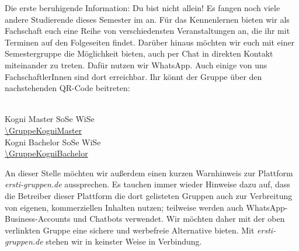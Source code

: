
\ifkogwiss
    Die erste beruhigende Information: Du bist nicht allein! Es fangen noch viele andere Studierende dieses Semester im \abschluss{} \studiengang an.
    Für das Kennenlernen bieten wir als Fachschaft euch eine Reihe von verschiedensten Veranstaltungen an, die ihr mit Terminen auf den Folgeseiten findet.
    Darüber hinaus möchten wir euch mit einer Semestergruppe die Möglichkeit bieten, auch per Chat in direkten Kontakt miteinander zu treten.
    Dafür nutzen wir WhatsApp. Auch einige von uns FachschaftlerInnen sind dort erreichbar. Ihr könnt der Gruppe über den nachstehenden QR-Code beitreten:

    \begin{center}
        \ifmaster
            {
                \color{green}
                \qrcode[height=38mm]{\GruppeKogniMaster} \\
            }
            \vspace*{0.3cm}
            {
                \footnotesize
                Kogni Master \ifsommersemester SoSe \else WiSe \fi \YEAR \\
                \url{\GruppeKogniMaster}
            }
        \else
            {
                \color{green}
                \qrcode[height=38mm]{\GruppeKogniBachelor} \\
            }
            \vspace*{0.3cm}
            {
                \footnotesize
                Kogni Bachelor \ifsommersemester SoSe \else WiSe \fi \YEAR \\
                \url{\GruppeKogniBachelor}
            }
        \fi
    \end{center}


    An dieser Stelle möchten wir außerdem einen kurzen Warnhinweis zur Plattform \textit{ersti-gruppen.de} aussprechen.
    Es tauchen immer wieder Hinweise dazu auf, dass die Betreiber dieser Plattform die dort gelisteten Gruppen auch zur Verbreitung von eigenen, kommerziellen Inhalten nutzen; teilweise werden auch WhatsApp-Business-Accounts und Chatbots verwendet.
    Wir möchten daher mit der oben verlinkten Gruppe eine sichere und werbefreie Alternative bieten. Mit \textit{ersti-gruppen.de} stehen wir in keinster Weise in Verbindung.

